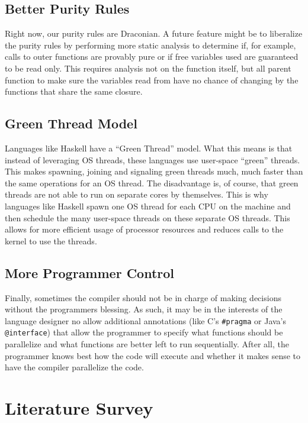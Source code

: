 \documentclass{acm_proc_article-sp}
\begin{document}
\subsection*{Better Purity Rules}
Right now, our purity rules are Draconian. A future feature might be to liberalize
the purity rules by performing more static analysis to determine if, for example, 
calls to outer functions are provably pure or if free variables used are guaranteed
to be read only. This requires analysis not on the function itself, but all parent
function to make sure the variables read from have no chance of changing by the
functions that share the same closure.

\subsection*{Green Thread Model}

Languages like Haskell have a ``Green Thread'' model. What this means
is that instead of leveraging OS threads, these languages use user-space
``green'' threads. This makes spawning, joining and signaling green threads
much, much faster than the same operations for an OS thread. The disadvantage
is, of course, that green threads are not able to run on separate cores by
themselves. This is why languages like Haskell spawn one OS thread for each
CPU on the machine and then schedule the many user-space threads on these
separate OS threads. This allows for more efficient usage of processor resources
and reduces calls to the kernel to use the threads.

\subsection*{More Programmer Control}

Finally, sometimes the compiler should not be in charge of making decisions without
the programmers blessing. As such, it may be in the interests of the language designer
no allow additional annotations (like C's \verb|#pragma| or Java's \verb|@interface|) that
allow the programmer to specify what functions should be parallelize and what functions are
better left to run sequentially. After all, the programmer knows best how the code will
execute and whether it makes sense to have the compiler parallelize the code.

\section*{Literature Survey}
\end{document}
